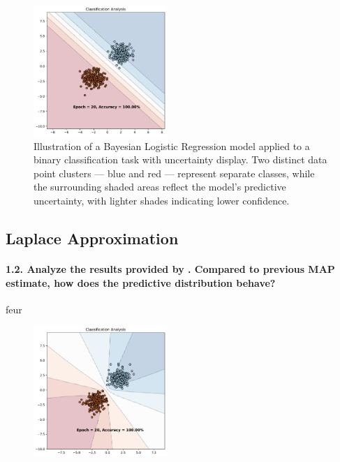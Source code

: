 \begin{figure}[H]
    \centering
    \includegraphics[width=0.45\textwidth]{logreg_map.pdf}
    \caption{Illustration of a Bayesian Logistic Regression model applied to a binary classification task with uncertainty display. Two distinct data point clusters — blue and red — represent separate classes, while the surrounding shaded areas reflect the model's predictive uncertainty, with lighter shades indicating lower confidence.}
    \label{fig:logreg_map}
\end{figure}

\subsection{Laplace Approximation}
\paragraph{1.2. Analyze the results provided by . Compared to previous MAP estimate, how does the predictive distribution behave?}

feur

\begin{figure}[H]
    \centering
    \includegraphics[width=0.45\textwidth]{laplace_approx.pdf}
    \caption{}
    \label{fig:laplace_approx}
\end{figure}


